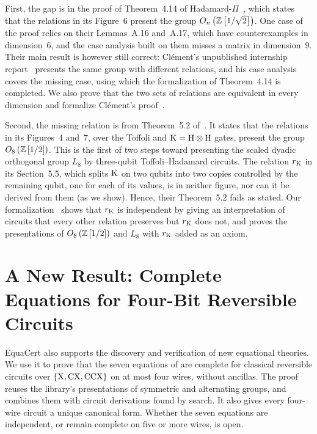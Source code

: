 \documentclass[acmsmall,screen,nonacm]{acmart}
\begin{document}
First, the gap is in the proof of Theorem~4.14 of Hadamard-$\Pi$~\cite{fang2026hadamard}, which states that the relations in its Figure~6
present the group $O_n\left(\mathbb{Z}\left[1/\sqrt2\right]\right)$. One case of the proof relies on their Lemmas~A.16 and~A.17, which have counterexamples in dimension~$6$, and the case analysis built on them misses a matrix in dimension~$9$.
Their main result is however still correct: Cl\'ement's unpublished internship report~\cite{clement2019thesis} presents the same group with different relations, and his case analysis covers the missing case, using which the formalization of Theorem~4.14 is completed. We also prove that the two sets of relations are equivalent in every dimension and formalize Cl\'ement's proof~\cite{equacert2026artifact}.

Second, the missing relation is from Theorem~5.2 of~\cite{amy2024toffoli}. It states that the relations in its Figures~4 and~7, over the Toffoli and $\mathrm{K} = \mathrm{H}\otimes\mathrm{H}$ gates, present the group $O_8\left(\mathbb{Z}\left[1/2\right]\right)$. This is the first of two steps toward presenting the scaled dyadic orthogonal group $L_8$ by three-qubit Toffoli--Hadamard circuits. The relation $r_{\mathrm{K}}$ in its Section~5.5, which splits $\mathrm{K}$ on two qubits into two copies controlled by the remaining qubit, one for each of its values, is in neither figure, nor can it be derived from them (as we show). Hence, their Theorem~5.2 fails as stated. Our formalization~\cite{equacert2026artifact} shows that $r_{\mathrm{K}}$ is independent by giving an interpretation of circuits that every other relation preserves but $r_{\mathrm{K}}$ does not, and proves the presentations of $O_8\left(\mathbb{Z}\left[1/2\right]\right)$ and $L_8$ with $r_{\mathrm{K}}$ added as an axiom.


\section{A New Result: Complete Equations for Four-Bit Reversible Circuits}\label{sec:xcxccx}

EquaCert also supports the discovery and verification of new equational
theories. We use it to prove that the seven equations of
 are complete for classical reversible circuits
over $\{\mathrm{X},\mathrm{CX},\mathrm{CCX}\}$ on at most four wires, without ancillas.
The proof reuses the library's presentations of symmetric and
alternating groups, and combines them with circuit derivations found
by search. It also gives every four-wire circuit a unique canonical
form. Whether the seven equations are independent, or remain complete
on five or more wires, is open.
\end{document}
